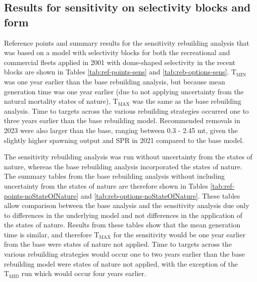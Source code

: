 \documentclass[11pt,
  english,
  letterpaper,
]{article}
\begin{document}

\hypertarget{results-for-sensitivity-on-selectivity-blocks-and-form}{%
\subsection{Results for sensitivity on selectivity blocks and form}\label{results-for-sensitivity-on-selectivity-blocks-and-form}}

\leavevmode\tagmcend\tagstructend


Reference points and summary results for the sensitivity rebuilding analysis that was based on a model with selectivity blocks for both the recreational and commercial fleets applied in 2001 with dome-shaped selectivity in the recent blocks are shown in Tables \ref{tab:ref-points-sens} and \ref{tab:reb-options-sens}. {\(\text{T}_\text{MIN}\)\leavevmode\tagmcend\tagstructend} was one year earlier than the base rebuilding analysis, but because mean generation time was one year earlier (due to not applying uncertainty from the natural mortality states of nature), {\(\text{T}_\text{MAX}\)\leavevmode\tagmcend\tagstructend} was the same as the base rebuilding analysis. Time to targets across the various rebuilding strategies occurred one to three years earlier than the base rebuilding model. Recommended removals in 2023 were also larger than the base, ranging between 0.3 - 2.45 mt, given the slightly higher spawning output and SPR in 2021 compared to the base model.

\leavevmode\tagmcend\tagstructend\par


The sensitivity rebuilding analysis was run without uncertainty from the states of nature, whereas the base rebuilding analysis incorporated the states of nature. The summary tables from the base rebuilding analysis without including uncertainty from the states of nature are therefore shown in Tables \ref{tab:ref-points-noStateOfNature} and \ref{tab:reb-options-noStateOfNature}. These tables allow comparison between the base analysis and the sensitivity analysis due only to differences in the underlying model and not differences in the application of the states of nature. Results from these tables show that the mean generation time is similar, and therefore {\(\text{T}_\text{MAX}\)\leavevmode\tagmcend\tagstructend} for the sensitivity would be one year earlier from the base were states of nature not applied. Time to targets across the various rebuilding strategies would occur one to two years earlier than the base rebuilding model were states of nature not applied, with the exception of the {\(\text{T}_\text{MID}\)\leavevmode\tagmcend\tagstructend} run which would occur four years earlier.
\end{document}

